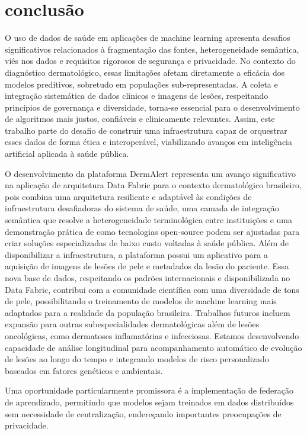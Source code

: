 \chapter{conclusão}

O uso de dados de saúde em aplicações de machine learning apresenta desafios significativos relacionados à fragmentação das fontes, heterogeneidade semântica, viés nos dados e requisitos rigorosos de segurança e privacidade. No contexto do diagnóstico dermatológico, essas limitações afetam diretamente a eficácia dos modelos preditivos, sobretudo em populações sub-representadas. A coleta e integração sistemática de dados clínicos e imagens de lesões, respeitando princípios de governança e diversidade, torna-se essencial para o desenvolvimento de algoritmos mais justos, confiáveis e clinicamente relevantes. Assim, este trabalho parte do desafio de construir uma infraestrutura capaz de orquestrar esses dados de forma ética e interoperável, viabilizando avanços em inteligência artificial aplicada à saúde pública.

O desenvolvimento da plataforma DermAlert representa um avanço significativo na aplicação de arquitetura Data Fabric para o contexto dermatológico brasileiro, pois combina uma arquitetura resiliente e adaptável às condições de infraestrutura desafiadoras do sistema de saúde, uma camada de integração semântica que resolve a heterogeneidade terminológica entre instituições e uma demonstração prática de como tecnologias open-source podem ser ajustadas para criar soluções especializadas de baixo custo voltadas à saúde pública. Além de disponibilizar a infraestrutura, a plataforma possui um aplicativo para a aquisição de imagens de lesões de pele e metadados da lesão do paciente. Essa nova base de dados, respeitando os padrões internacionais e disponibilizada no Data Fabric, contribui com a comunidade científica com uma diversidade de tons de pele, possibilitando o treinamento de modelos de machine learning mais adaptados para a realidade da população brasileira.
Trabalhos futuros incluem expansão para outras subespecialidades dermatológicas além de lesões oncológicas, como dermatoses inflamatórias e infecciosas. Estamos desenvolvendo capacidade de análise longitudinal para acompanhamento automático de evolução de lesões ao longo do tempo e integrando modelos de risco personalizado baseados em fatores genéticos e ambientais.

Uma oportunidade particularmente promissora é a implementação de federação de aprendizado, permitindo que modelos sejam treinados em dados distribuídos sem necessidade de centralização, endereçando importantes preocupações de privacidade.

